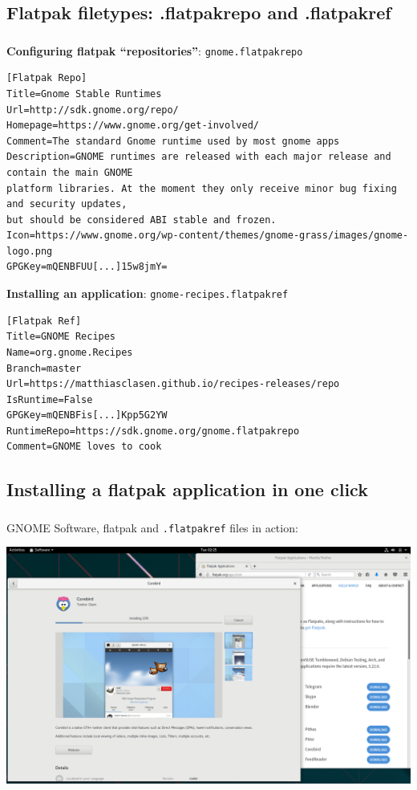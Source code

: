 \subsection{Flatpak filetypes: .flatpakrepo and .flatpakref}
\begin{frame}[fragile]
  \frametitle{\insertsubsection}

  \textbf{Configuring flatpak ``repositories''}: \texttt{gnome.flatpakrepo}
  \begin{tiny}
\begin{verbatim}
[Flatpak Repo]
Title=Gnome Stable Runtimes
Url=http://sdk.gnome.org/repo/
Homepage=https://www.gnome.org/get-involved/
Comment=The standard Gnome runtime used by most gnome apps
Description=GNOME runtimes are released with each major release and contain the main GNOME
platform libraries. At the moment they only receive minor bug fixing and security updates,
but should be considered ABI stable and frozen.
Icon=https://www.gnome.org/wp-content/themes/gnome-grass/images/gnome-logo.png
GPGKey=mQENBFUU[...]15w8jmY=
\end{verbatim}
  \end{tiny}

  \textbf{Installing an application}: \texttt{gnome-recipes.flatpakref}
  \begin{tiny}
\begin{verbatim}
[Flatpak Ref]
Title=GNOME Recipes
Name=org.gnome.Recipes
Branch=master
Url=https://matthiasclasen.github.io/recipes-releases/repo
IsRuntime=False
GPGKey=mQENBFis[...]Kpp5G2YW
RuntimeRepo=https://sdk.gnome.org/gnome.flatpakrepo
Comment=GNOME loves to cook
\end{verbatim}
  \end{tiny}

\end{frame}

\subsection{Installing a flatpak application in one click}
\begin{frame}[fragile]
  \frametitle{\insertsubsection}

  GNOME Software, flatpak and \texttt{.flatpakref} files in action:
  \begin{center}
    \includegraphics[width=1\textwidth]{images/corebird.png}
  \end{center}

\end{frame}
